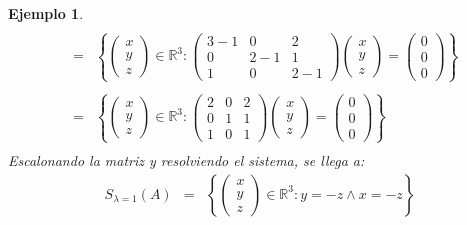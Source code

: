\documentclass[12pt]{book}
\newtheorem{ejem}{Ejemplo}
\def\R{\mathbb{R}}
\begin{document}
\begin{ejem}
{\begin{eqnarray*}
\\
&=&\left\{ \left(\begin{array}{c} x  \\ y \\ z  \end{array}\right)\in\R^3: \left(\begin{array}{ccc} 3-1 & 0 & 2 \\ 0 & 2-1 & 1 \\ 1 & 0 &2-1  \end{array}\right)\left(\begin{array}{c} x  \\ y \\ z  \end{array}\right)=\left(\begin{array}{c} 0 \\ 0 \\ 0  \end{array}\right)\right\}\\
\\
&=&\left\{ \left(\begin{array}{c} x  \\ y \\ z  \end{array}\right)\in\R^3: \left(\begin{array}{ccc} 2 & 0 & 2 \\ 0 & 1 & 1 \\ 1 & 0 & 1  \end{array}\right)\left(\begin{array}{c} x  \\ y \\ z  \end{array}\right)=\left(\begin{array}{c} 0 \\ 0 \\ 0  \end{array}\right)\right\}\\
\end{eqnarray*}
Escalonando la matriz y resolviendo el sistema, se llega a:
\begin{eqnarray*}
S_{\lambda=1}(A)&=&\left\{ \left(\begin{array}{c} x  \\ y \\ z  \end{array}\right)\in\R^3:  y=-z \wedge x=-z\right\}\\

\end{eqnarray*}}
\end{ejem}
\end{document}
